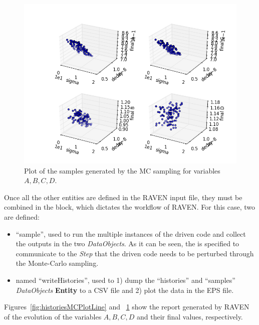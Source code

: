 \begin{enumerate}
\begin{figure}[h!]
  \includegraphics[scale=0.7]{../../tests/framework/user_guide/ForwardSamplingStrategies/gold/RunDir/MonteCarlo/1-samplesPlot3D_scatter-scatter-scatter-scatter.png}
  \caption{Plot of the samples generated by the MC sampling for variables $A,B,C,D$.}
  \label{fig:samplesMCPlotLine}
 \end{figure}
   Once all the other entities are defined in the RAVEN input file, they must be combined in the
    block, which dictates the workflow of RAVEN.  For this case,
   two  are defined:
   \begin{itemize}
     \item {} ``sample'', used to run the multiple
     instances of the driven code and
     collect the outputs in the two \textit{DataObjects}. As it can be
     seen, the  is specified to communicate to the
     \textit{Step} that the driven code needs to
     be perturbed through the Monte-Carlo sampling.
     \item  {} named ``writeHistories'', used to 1) dump
     the ``histories'' and ``samples'' \textit{DataObjects}
     \textbf{Entity} to a CSV file and 2) plot the data in the EPS file.
   \end{itemize}
\end{enumerate}
 Figures~\ref{fig:historiesMCPlotLine} and ~\ref{fig:samplesMCPlotLine} show the report
 generated by RAVEN of the evolution of the
 variables $A,B,C,D$ and their final values, respectively.
